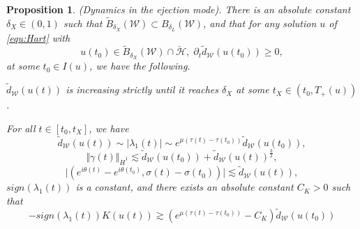 \documentclass[reqno, 11pt]{amsart}
\numberwithin{equation}{section}
\theoremstyle{plain}
\newtheorem{proposition}[theorem]{Proposition}
\theoremstyle{definition}
\numberwithin{equation}{section}
\numberwithin{theorem}{section}
\numberwithin{equation}{section}
\numberwithin{equation}{section}
\numberwithin{theorem}{section}
\begin{document}
	
	\begin{proposition}(Dynamics in the ejection mode)\label{prop:eject mod}. There is an absolute constant $\delta_{X}\in(0,1)$ such that $\widetilde{B}_{\delta_{X}}(\mathcal{W})\subset B_{\delta_{L}}(\mathcal{W})$, and that for any solution $u$ of \eqref{equ:Hart} with 
		\begin{equation}\label{eje mode}
		u(t_0)\in \widetilde{B}_{\delta_{X}}(\mathcal{W})\cap \check{\mathcal{H}},\; \partial_{t}\widetilde{d}_{\mathcal{W}}(u(t_0))\geq 0,
		\end{equation}	
		at some $t_0\in I(u)$, we have the following.
		
		$\widetilde{d}_{\mathcal{W}}(u(t))$ is increasing strictly until it reaches $\delta_{X}$ at some $t_{X}\in (t_0,T_{+}(u))$. 
		
		For all $t\in \left[ t_0,t_{X} \right]$, we have
		\begin{equation}\label{est:dyn d}
		\widetilde{d}_{\mathcal{W}}(u(t))\sim |\lambda_{1}(t)|\sim e^{\mu(\tau(t)-\tau(t_0) )}\widetilde{d}_{\mathcal{W}}(u(t_0)),
		\end{equation}
		\begin{equation}\label{est:dyn gamm}
		\Vert \gamma(t) \Vert_{\dot H^1} \lesssim \widetilde{d}_{\mathcal{W}}(u(t_0))+\widetilde{d}_{\mathcal{W}}(u(t))^\frac{3}{2},
		\end{equation}
		\begin{equation}\label{est:dyn epara}
		\Big| \left( e^{i\theta(t)}-e^{i\theta(t_0)},\sigma(t)-\sigma(t_0) \right) \Big| \lesssim \widetilde{d}_{\mathcal{W}}(u(t)),
		\end{equation}
		$sign(\lambda_{1}(t))$ is a constant, and there exists an absolute constant $C_K>0$ such that 
		\begin{equation}\label{est:dyn Keigen}
		-sign(\lambda_{1}(t))K(u(t))\gtrsim \left( e^{\mu(\tau(t)-\tau(t_0) )}-C_K \right)\widetilde{d}_{\mathcal{W}}(u(t_0))
		\end{equation}
	\end{proposition}
\end{document}
